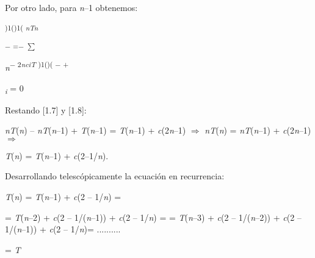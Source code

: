 \documentclass[12pt]{article}
\renewcommand{\_}{\kern-1.5pt\textunderscore\kern-1.5pt}
\begin{document}
{\fontsize{10pt}{12.0pt}\selectfont Por otro lado, para \textit{n}–1 obtenemos: \par}\par

\textsuperscript{)1()1( \textit{nTn }}\par

\textsuperscript{$-$  =$-$  $ \sum $ }{\fontsize{7pt}{8.4pt}\selectfont \textit{n}\textsuperscript{$-$ 2\textit{nciT })1()( $-$ + }{\fontsize{6pt}{7.2pt} \textit{\textsubscript{i }}= 0 {\fontsize{10pt}{12.0pt}\selectfont [1.8] \par}\par}\par}\par

{\fontsize{10pt}{12.0pt}\selectfont Restando [1.7] y [1.8]: \par}\par

{\fontsize{10pt}{12.0pt}\selectfont \textit{nT}(\textit{n}) – \textit{nT}(\textit{n}–1) + \textit{T}(\textit{n}–1) = \textit{T}(\textit{n}–1) + \textit{c}(2\textit{n}–1) $ \Rightarrow $  \textit{nT}(\textit{n}) = \textit{nT}(\textit{n}–1) + \textit{c}(2\textit{n}–1) $ \Rightarrow $  \par}\par

{\fontsize{10pt}{12.0pt}\selectfont \textit{T}(\textit{n}) = \textit{T}(\textit{n}–1) + \textit{c}(2–1/\textit{n}). \par}\par

{\fontsize{10pt}{12.0pt}\selectfont Desarrollando telescópicamente la ecuación en recurrencia: \par}\par

{\fontsize{10pt}{12.0pt}\selectfont \textit{T}(\textit{n}) = \textit{T}(\textit{n}–1) + \textit{c}(2 – 1/\textit{n}) = \par}\par

{\fontsize{10pt}{12.0pt}\selectfont = \textit{T}(\textit{n}–2) + \textit{c}(2 – 1/(\textit{n}–1)) + \textit{c}(2 – 1/\textit{n}) = = \textit{T}(\textit{n}–3) + \textit{c}(2 – 1/(\textit{n}–2)) + \textit{c}(2 – 1/(\textit{n}–1)) + \textit{c}(2 – 1/\textit{n})= .......... \par}\par

{\fontsize{10pt}{12.0pt}\selectfont = \textit{T }\par}\par
\end{document}
